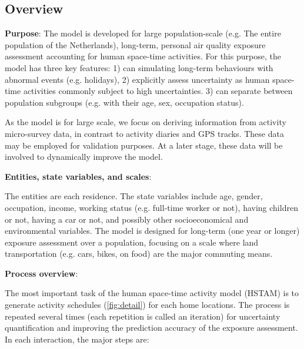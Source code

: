 \documentclass[]{article}
\begin{document}
\subsection{Overview} 

\textbf{Purpose}:
The model is developed for large population-scale (e.g. The entire population of the Netherlands), long-term, personal air quality exposure assessment accounting for human space-time activities. For this purpose, the model has three key features:
1) can simulating long-term behaviours with abnormal events (e.g. holidays),
2) explicitly assess uncertainty as human space-time activities commonly subject to high uncertainties.
3) can separate between population subgroups (e.g. with their age, sex, occupation status).

As the model is for large scale, we focus on deriving information from activity micro-survey data, in contrast to activity diaries and GPS tracks. These data may be employed for validation purposes. At a later stage, these data will be involved to dynamically improve the model.   

\textbf{Entities, state variables, and scales}:

The entities are each residence. The state variables include age, gender, occupation, income, working status (e.g. full-time worker or not), having children or not, having a car or not, and possibly other socioeconomical and environmental variables. The model is designed for long-term (one year or longer) exposure assessment over a population, focusing on a scale where land transportation (e.g. cars, bikes, on food) are the major commuting means. 

\textbf{Process overview}:

The most important task of the human space-time activity model (HSTAM) is to generate activity schedules (\cref{fig:detail}) for each home locations. The process is repeated several times (each repetition is called an iteration) for uncertainty quantification and improving the prediction accuracy of the exposure assessment.  In each interaction, the major steps are:   
\end{document}
